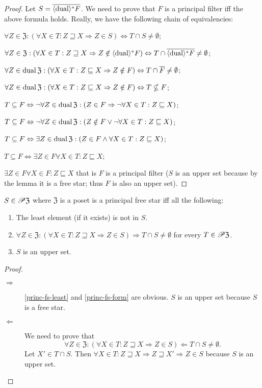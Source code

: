 \begin{proof}
Let $S=\overline{\langle\operatorname{dual}\rangle^{\ast}F}$. We need to prove
that $F$ is a principal filter iff the above formula holds. Really, we have the following chain
of equivalencies:

$\forall Z\in\mathfrak{Z}:(\forall X\in T:Z\sqsupseteq X\Rightarrow Z\in S)\Leftrightarrow T\cap S\neq\emptyset$;

$\forall Z\in\mathfrak{Z}:(\forall X\in T:Z\sqsupseteq X\Rightarrow Z\notin\langle\operatorname{dual}\rangle^{\ast}F)\Leftrightarrow T\cap\overline{\langle\operatorname{dual}\rangle^{\ast}F}\neq\emptyset$;

$\forall Z\in\operatorname{dual}\mathfrak{Z}:(\forall X\in T:Z\sqsubseteq X\Rightarrow Z\notin F)\Leftrightarrow T\cap\overline{F}\neq\emptyset$;

$\forall Z\in\operatorname{dual}\mathfrak{Z}:(\forall X\in T:Z\sqsubseteq X\Rightarrow Z\notin F)\Leftrightarrow T\nsubseteq F$;

$T\subseteq F\Leftrightarrow\neg\forall Z\in\operatorname{dual}\mathfrak{Z}:(Z\in F\Rightarrow\neg\forall X\in T:Z\sqsubseteq X)$;

$T\subseteq F\Leftrightarrow\neg\forall Z\in\operatorname{dual}\mathfrak{Z}:(Z\notin F\vee\neg\forall X\in T:Z\sqsubseteq X)$;

$T\subseteq F\Leftrightarrow\exists Z\in\operatorname{dual}\mathfrak{Z}:(Z\in F\wedge\forall X\in T:Z\sqsubseteq X)$;

$T\subseteq F\Leftrightarrow\exists Z\in F\forall X\in T:Z\sqsubseteq X$;

$\exists Z\in F\forall X\in F:Z\sqsubseteq X$ that is $F$ is a principal
filter ($S$ is an upper set because by the lemma it is a free star;
thus $F$ is also an upper set).\end{proof}
\begin{prop}
$S\in\mathscr{P}\mathfrak{Z}$ where $\mathfrak{Z}$ is a poset is a
principal free star iff all the following:
\begin{enumerate}
\item \label{princ-fs-least}The least element (if it exists) is not in
$S$.
\item \label{princ-fs-form}$\forall Z\in\mathfrak{Z}:(\forall X\in T:Z\sqsupseteq X\Rightarrow Z\in S)\Rightarrow T\cap S\neq\emptyset$
for every $T\in\mathscr{P}\mathfrak{Z}$.
\item $S$ is an upper set.
\end{enumerate}
\end{prop}
\begin{proof}
~
\begin{description}
\item [{$\Rightarrow$}] \ref{princ-fs-least} and \ref{princ-fs-form}
are obvious. $S$ is an upper set because $S$ is a free star.
\item [{$\Leftarrow$}] We need to prove that 
\[
\forall Z\in\mathfrak{Z}:(\forall X\in T:Z\sqsupseteq X\Rightarrow Z\in S)\Leftarrow T\cap S\neq\emptyset.
\]
Let $X'\in T\cap S$. Then $\forall X\in T:Z\sqsupseteq X\Rightarrow Z\sqsupseteq X'\Rightarrow Z\in S$
because $S$ is an upper set.
\end{description}
\end{proof}
